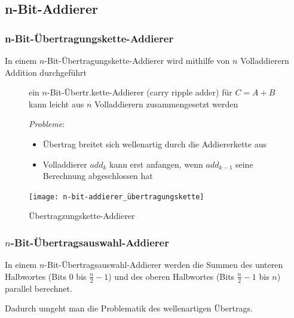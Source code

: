 \documentclass[12pt]{report}
\begin{document}
\subsection{n-Bit-Addierer}
\subsubsection{n-Bit-Übertragungskette-Addierer}
\begin{defbox}
  In einem $n$-Bit-Übertragungskette-Addierer wird mithilfe von $n$ Volladdierern Addition durchgeführt
\end{defbox}
\begin{figure}[H]
  \begin{minipage}[t]{.45\textwidth}
    ein $n$-Bit-Übertr.kette-Addierer (carry ripple adder) für $C = A + B$
    kann leicht aus $n$ Volladdierern zusammengesetzt werden\\
    \par \textit{Probleme}:
    \begin{itemize}
      \item Übertrag breitet sich wellenartig durch die Addiererkette aus
      \item Volladdierer $add_k$ kann erst anfangen, wenn $add_{k-1}$ seine Berechnung abgeschlossen hat
    \end{itemize}
  \end{minipage}
  \hfill
  \begin{minipage}[t]{.45\textwidth}
    \caption{Übertragzungskette-Addierer}
    \centering
    \vspace{0pt}
    \texttt{[image: n-bit-addierer\_übertragungskette]}
  \end{minipage}
\end{figure}

\subsubsection{$n$-Bit-Übertragsauswahl-Addierer}
\begin{defbox}
  In einem $n$-Bit-Übertragsauswahl-Addierer werden die Summen des unteren Halbwortes (Bits 0 bis $\frac{n}{2}-1$) und 
  des oberen Halbwortes (Bits $\frac{n}{2}-1$ bis $n$) parallel berechnet.

  Dadurch umgeht man die Problematik des wellenartigen Übertrags.
\end{defbox}
\end{document}
